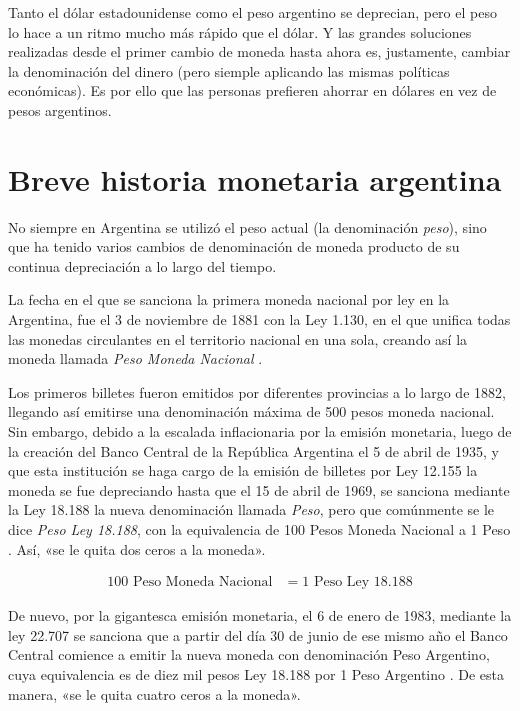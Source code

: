 \documentclass[12pt,a4paper,twoside]{book}
\begin{document}
Tanto el dólar estadounidense como el peso argentino se deprecian, pero el peso lo hace a un ritmo mucho más rápido que el dólar. Y las grandes soluciones realizadas desde el primer cambio de moneda hasta ahora es, justamente, cambiar la denominación del dinero (pero siemple aplicando las mismas políticas económicas). Es por ello que las personas prefieren ahorrar en dólares en vez de pesos argentinos.

\section{Breve historia monetaria argentina}
No siempre en Argentina se utilizó el peso actual (la denominación \textit{peso}), sino que ha tenido varios cambios de denominación de moneda producto de su continua depreciación a lo largo del tiempo.

La fecha en el que se sanciona la primera moneda nacional por ley en la Argentina, fue el 3 de noviembre de 1881 con la Ley 1.130, en el que unifica todas las monedas circulantes en el territorio nacional en una sola, creando así la moneda llamada \textit{Peso Moneda Nacional} \cite{dineroarg:pmn}.

Los primeros billetes fueron emitidos por diferentes provincias a lo largo de 1882, llegando así emitirse una denominación máxima de 500 pesos moneda nacional. Sin embargo, debido a la escalada inflacionaria por la emisión monetaria, luego de la creación del Banco Central de la República Argentina el 5 de abril de 1935, y que esta institución se haga cargo de la emisión de billetes por Ley 12.155 \cite{dineroarg:bcra} la moneda se fue depreciando hasta que el 15 de abril de 1969, se sanciona mediante la Ley 18.188 la nueva denominación llamada \textit{Peso}, pero que comúnmente se le dice \textit{Peso Ley 18.188}, con la equivalencia de 100 Pesos Moneda Nacional a 1 Peso \cite{dineroarg:18188}. Así, «se le quita dos ceros a la moneda».

\begin{align*}
100 \text{ Peso Moneda Nacional} &= 1 \text{ Peso Ley 18.188}
\end{align*}

De nuevo, por la gigantesca emisión monetaria, el 6 de enero de 1983, mediante la ley 22.707 se sanciona que a partir del día 30 de junio de ese mismo año el Banco Central comience a emitir la nueva moneda con denominación Peso Argentino, cuya equivalencia es de diez mil pesos Ley 18.188 por 1 Peso Argentino \cite{dineroarg:pesarg}. De esta manera, «se le quita cuatro ceros a la moneda».
\end{document}
